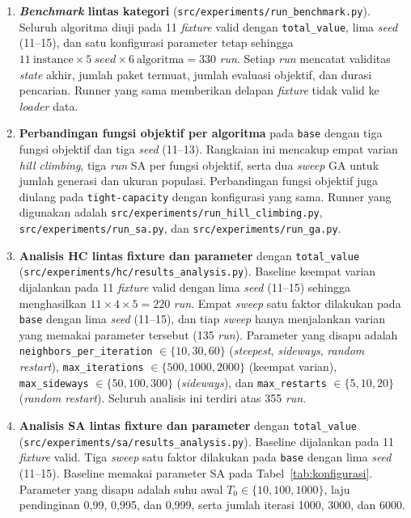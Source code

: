 \begin{enumerate}
    \renewcommand{\labelenumi}{(\arabic{enumi})}
    \item \textbf{\textit{Benchmark} lintas kategori} (\texttt{src/experiments/run\_benchmark.py}). Seluruh algoritma diuji pada 11 \textit{fixture} valid dengan \texttt{total\_value}, lima \textit{seed} (11--15), dan satu konfigurasi parameter tetap sehingga $11\ \text{instance} \times 5\ \textit{seed} \times 6\ \text{algoritma} = 330$ \textit{run}. Setiap \textit{run} mencatat validitas \textit{state} akhir, jumlah paket termuat, jumlah evaluasi objektif, dan durasi pencarian. Runner yang sama memberikan delapan \textit{fixture} tidak valid ke \textit{loader} data.
    \item \textbf{Perbandingan fungsi objektif per algoritma} pada \texttt{base} dengan tiga fungsi objektif dan tiga \textit{seed} (11--13). Rangkaian ini mencakup empat varian \textit{hill climbing}, tiga \textit{run} SA per fungsi objektif, serta dua \textit{sweep} GA untuk jumlah generasi dan ukuran populasi. Perbandingan fungsi objektif juga diulang pada \texttt{tight-capacity} dengan konfigurasi yang sama. Runner yang digunakan adalah \texttt{src/\allowbreak experiments/\allowbreak run\_hill\_climbing.py}, \texttt{src/\allowbreak experiments/\allowbreak run\_sa.py}, dan \texttt{src/\allowbreak experiments/\allowbreak run\_ga.py}.
    \item \textbf{Analisis HC lintas fixture dan parameter} dengan \texttt{total\_value} (\texttt{src/\allowbreak experiments/\allowbreak hc/\allowbreak results\_analysis.py}). Baseline keempat varian dijalankan pada 11 \textit{fixture} valid dengan lima \textit{seed} (11--15) sehingga menghasilkan $11\times4\times5=220$ \textit{run}. Empat \textit{sweep} satu faktor dilakukan pada \texttt{base} dengan lima \textit{seed} (11--15), dan tiap \textit{sweep} hanya menjalankan varian yang memakai parameter tersebut (135 \textit{run}). Parameter yang disapu adalah \texttt{neighbors\_\allowbreak per\_\allowbreak iteration} $\in\{10,30,60\}$ (\textit{steepest}, \textit{sideways}, \textit{random restart}), \texttt{max\_\allowbreak iterations} $\in\{500,1000,2000\}$ (keempat varian), \texttt{max\_\allowbreak sideways} $\in\{50,100,300\}$ (\textit{sideways}), dan \texttt{max\_\allowbreak restarts} $\in\{5,10,20\}$ (\textit{random restart}). Seluruh analisis ini terdiri atas 355 \textit{run}.
    \item \textbf{Analisis SA lintas fixture dan parameter} dengan \texttt{total\_value} (\texttt{src/\allowbreak experiments/\allowbreak sa/\allowbreak results\_analysis.py}). Baseline dijalankan pada 11 \textit{fixture} valid. Tiga \textit{sweep} satu faktor dilakukan pada \texttt{base} dengan lima \textit{seed} (11--15). Baseline memakai parameter SA pada Tabel~\ref{tab:konfigurasi}. Parameter yang disapu adalah suhu awal $T_0\in\{10,100,1000\}$, laju pendinginan 0,99, 0,995, dan 0,999, serta jumlah iterasi 1000, 3000, dan 6000.

\end{enumerate}
